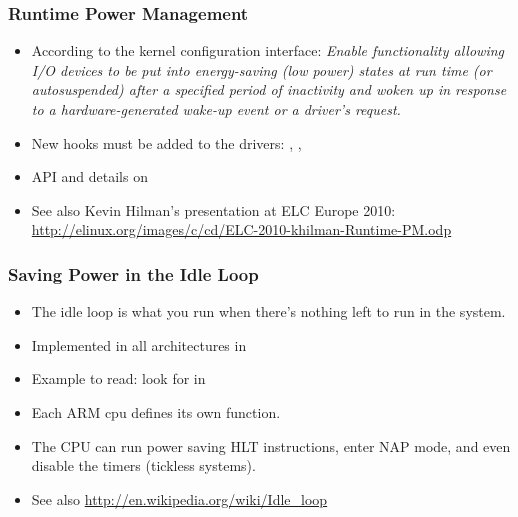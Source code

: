 \begin{frame}
  \frametitle{Runtime Power Management}
  \begin{itemize}
  \item According to the kernel configuration interface: \emph{Enable
      functionality allowing I/O devices to be put into energy-saving
      (low power) states at run time (or autosuspended) after a
      specified period of inactivity and woken up in response to a
      hardware-generated wake-up event or a driver's request.}
  \item New hooks must be added to the drivers:
    , ,
  \item API and details on 
  \item See also Kevin Hilman's presentation at ELC Europe 2010:
    \url{http://elinux.org/images/c/cd/ELC-2010-khilman-Runtime-PM.odp}
  \end{itemize}
\end{frame}

\begin{frame}
  \frametitle{Saving Power in the Idle Loop}
  \begin{itemize}
  \item The idle loop is what you run when there's nothing left to run
    in the system.
  \item Implemented in all architectures in
  \item Example to read: look for  in
  \item Each ARM cpu defines its own  function.
  \item The CPU can run power saving HLT instructions, enter NAP mode,
    and even disable the timers (tickless systems).
  \item See also \url{http://en.wikipedia.org/wiki/Idle_loop}
  \end{itemize}
\end{frame}

